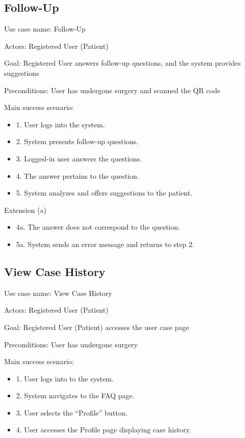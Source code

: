 \documentclass[12pt,oneside,openright,a4paper]{cpe-english-project}
\begin{document}
      \subsection{Follow-Up}
        \qquad Use case name: Follow-Up \par
        \qquad Actors: Registered User (Patient) \par
        \qquad Goal: Registered User answers follow-up questions, and the system provides suggestions \par
        \qquad Preconditions: User has undergone surgery and scanned the QR code \par
        \qquad Main success scenario:
        \begin{itemize}
          \item[] 1. User logs into the system.
          \item[] 2. System presents follow-up questions.
          \item[] 3. Logged-in user answers the questions.
          \item[] 4. The answer pertains to the question.
          \item[] 5. System analyzes and offers suggestions to the patient.
        \end{itemize}
        \qquad Extension (a)
        \begin{itemize}
          \item[] 4a. The answer does not correspond to the question.
          \item[] 5a. System sends an error message and returns to step 2.
        \end{itemize}

      \subsection{View Case History}
        \qquad Use case name: View Case History \par
        \qquad Actors: Registered User (Patient) \par
        \qquad Goal: Registered User (Patient) accesses the user case page \par
        \qquad Preconditions: User has undergone surgery \par
        \qquad Main success scenario:
        \begin{itemize}
          \item[] 1. User logs into to the system.
          \item[] 2. System navigates to the FAQ page.
          \item[] 3. User selects the “Profile” button.
          \item[] 4. User accesses the Profile page displaying case history.
        \end{itemize}
\end{document}
